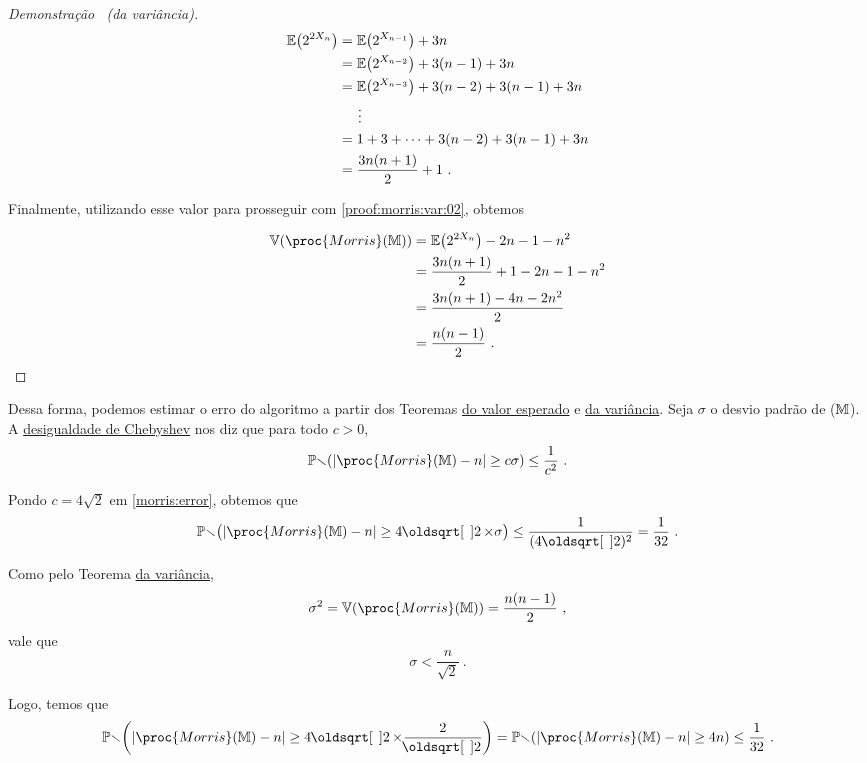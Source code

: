 \begin{proof}[Demonstração \ (da variância)]
  \begin{align*}
    \mathbb{E}\big(2^{2X_n}\big)
    &= \mathbb{E}\big(2^{X_{n-1}}\big) + 3n \\
    &=  \mathbb{E}\big(2^{X_{n-2}}\big) + 3(n - 1) + 3n \\
    &=  \mathbb{E}\big(2^{X_{n-3}}\big) + 3(n - 2) + 3(n - 1) + 3n \\
    &\hspace{5mm} \vdots\\
    &=1 + 3 + \dots + 3(n-2) + 3(n-1) + 3n \\
    &=\frac{3n(n+1)}{2} + 1 \ .
  \end{align*}

  Finalmente, utilizando esse valor para prosseguir com \eqref{proof:morris:var:02}, obtemos

  \begin{align*}
    \Vbb(\proc{Morris}(\Mbb))
    &= \Ebb\big(2^{2X_n}\big) - 2n - 1 - n^2 \\
    &= \frac{3n(n+1)}{2} + 1 - 2n -1 -n^2 \\
    &= \frac{3n(n+1) - 4n - 2n^2}{2} \\
    &= \frac{n(n-1)}{2} \ .
  \end{align*}

\end{proof}

Dessa forma, podemos estimar o erro do algoritmo  a partir dos Teoremas 
\hyperref[morris:theorem:expected_value]{do valor esperado} e \hyperref[morris:theorem:variance]{da variância}. Seja
$\sigma$ o desvio padrão de ($\mathbb{M}$). A \hyperref[ap:chebyshev]{desigualdade de Chebyshev} nos diz que 
para todo $c > 0$, 
\begin{align}
  \Pbb(|\proc{Morris}(\Mbb) - n| \geq c\sigma) \leq \frac{1}{c^2} \ .  \label{morris:error}
\end{align}

Pondo $c = 4\sqrt{2}$ em \eqref{morris:error}, obtemos que 
\begin{align}
  \Pbb\big(|\proc{Morris}(\Mbb) - n| \geq 4\sqrt{2} \times \sigma\big) \leq \frac{1}{(4\sqrt{2})^2} = \frac{1}{32} \ .
\end{align}

Como pelo Teorema \hyperref[morris:theorem:variance]{da variância},
\[ \sigma^2 = \Vbb(\proc{Morris}(\Mbb)) = \frac{n(n-1)}{2} \ , \] vale que
\[ \sigma < \frac{n}{\sqrt{2}} \ . \]

Logo, temos que
\[  \Pbb\bigg(|\proc{Morris}(\Mbb) - n| \geq 4\sqrt{2} \times \frac{2}{\sqrt{2}}\bigg) =  
    \Pbb(|\proc{Morris}(\Mbb) - n| \geq 4n) \leq \frac{1}{32} \ . \]
    
